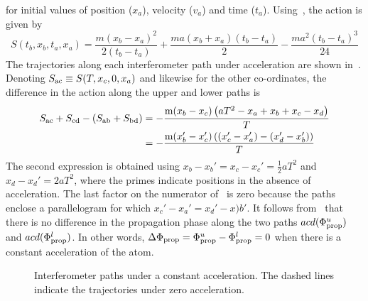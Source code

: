 for initial values of position ($x_a$), velocity ($v_a$) and time
($t_a$).     
Using~, the action is given by 
\begin{equation}
  \label{eq:action_classical}
  S(t_b,x_b,t_a,x_a) = \frac{m(x_b-x_a)^2}{2(t_b-t_a)} + \frac{m a
  (x_b+x_a)(t_b-t_a)}{2} -\frac{m a^2 (t_b-t_a)^3}{24} 
\end{equation}
The trajectories along each interferometer path under acceleration are
shown in~. Denoting
$S_\textnormal{ac} \equiv S(T,x_c,0,x_a)$ and likewise for the other
co-ordinates, the difference in the action along the upper and lower paths is 
\begin{align}
  S_\textnormal{ac} + S_\textnormal{cd} -
\left(S_\textnormal{ab}+S_\textnormal{bd}\right) &= -\frac{\text{m}
(x_b-x_c) \left(a T^2- x_a+x_b+x_c-x_d\right)}{T}\nonumber \\
&= -\frac{\text{m}
(x'_b-x'_c) \left((x'_c-x'_a) - (x'_d-x'_b)\right)}{T}
\label{eq:prop_action}
\end{align}
The second expression is obtained using $x_b - x_b' = x_c - x_c'
= \frac{1}{2}a T^2$ and $x_d-x_d' = 2 a T^2$, where the primes
indicate positions in the absence of acceleration. The last factor on
the numerator of~ is zero because the
paths enclose a parallelogram for which $x_c' - x_a' = x_d'-x)b'$. It follows
from~ that there is no difference in the
propagation phase along the two paths $acd
(\Phi_\textnormal{prop}^{u})$ and $acd (\Phi_\textnormal{prop}^{l})$. In other words,
$\Delta\Phi_\textnormal{prop} = \Phi_\textnormal{prop}^{u}-
\Phi_\textnormal{prop}^{l}=
0$ when there is a constant acceleration of the atom.
\begin{figure}[htpb]
  \centering
  \resizebox{0.8\textwidth}{!}{}
  \caption[Interferemeter paths under constant
  acceleration]{Interferometer paths under a constant acceleration.
  The dashed lines indicate the trajectories under zero acceleration.}
\label{fig:interferometer_accel}
\end{figure}
